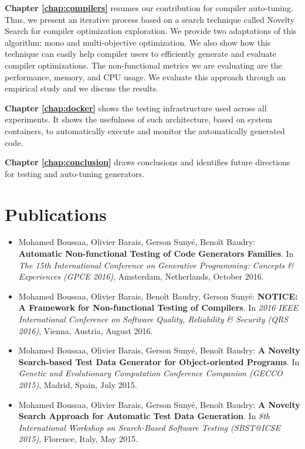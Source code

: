 \textbf{Chapter \ref{chap:compilers}} resumes our contribution for compiler auto-tuning. Thus, we present an iterative process based on a search technique called Novelty Search for compiler optimization exploration. We provide two adaptations of this algorithm: mono and multi-objective optimization. We also show how this technique can easily help compiler users to efficiently generate and evaluate compiler optimizations. The non-functional metrics we are evaluating are the performance, memory, and CPU usage. We evaluate this approach through an empirical study and we discuss the results.

\textbf{Chapter \ref{chap:docker}} shows the testing infrastructure used across all experiments. It shows the usefulness of such architecture, based on system containers, to automatically execute and monitor the automatically generated code. 

\textbf{Chapter \ref{chap:conclusion}} draws conclusions and identifies future directions for testing and auto-tuning generators.
\newpage
\section{Publications}

\begin{itemize}
	
	\item Mohamed Boussaa, Olivier Barais, Gerson Suny\'e, Beno\^it Baudry:
	\textbf{Automatic Non-functional Testing of Code Generators Families}. In
	\textit{The 15th International Conference on Generative Programming: Concepts \& Experiences (GPCE 2016)},
	Amsterdam, Netherlands, October 2016.

	\item Mohamed Boussaa, Olivier Barais, Beno\^it Baudry, Gerson Suny\'e:
	\textbf{NOTICE: A Framework for Non-functional Testing of Compilers}. In 
	\textit{2016 IEEE International Conference on Software Quality, Reliability \& Security (QRS 2016)}, Vienna, Austria, August 2016.
	
	\item Mohamed Boussaa, Olivier Barais, Gerson Suny\'e, Beno\^it Baudry:
	\textbf{A Novelty Search-based Test Data Generator for Object-oriented Programs}. In 
	\textit{Genetic and Evolutionary Computation Conference Companion (GECCO 2015)}, 
	Madrid, Spain, July 2015.
	
	\item Mohamed Boussaa, Olivier Barais, Gerson Suny\'e, Beno\^it Baudry:
	\textbf{A Novelty Search Approach for Automatic Test Data Generation}. In
	\textit{8th International Workshop on Search-Based Software Testing (SBST@ICSE 2015)}, 
	Florence, Italy, May 2015.

	
	
\end{itemize}


